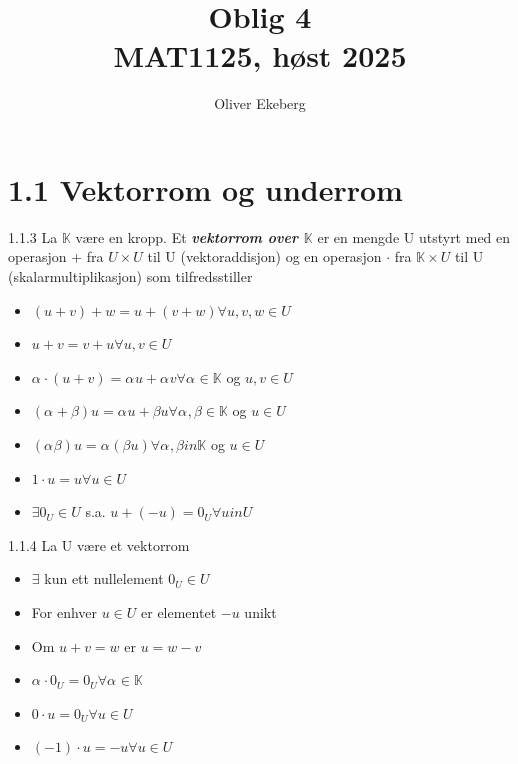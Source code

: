 \documentclass[a4paper,norsk]{article}
\title{Oblig 4 \\ MAT1125, høst 2025}
\author{Oliver Ekeberg}
\begin{document}
\maketitle

\tableofcontents

\section*{1.1 Vektorrom og underrom}

\begin{definitionbox}{1.1.3}{}
La $ \mathbb{K}   $ være en kropp. Et \textbf{\textit{vektorrom over $ \mathbb{K} $ }}er en mengde U utstyrt med en operasjon + fra $ U \times U $ til U (vektoraddisjon) og en operasjon $ \cdot $ fra $ \mathbb{K} \times U $ til U (skalarmultiplikasjon) som tilfredsstiller

\begin{itemize}
    \item $ \left( u+v \right) + w = u + \left( v + w \right) \forall u, v, w \in U$ 
    \item $ u + v = v + u \forall u, v \in U $ 
    \item $ \alpha_{}^{} \cdot \left( u + v \right)  = \alpha_{}^{} u + \alpha_{}^{} v \forall \alpha_{}^{} \in \mathbb{K}$ og $ u, v \in U $
    \item $ \left( \alpha_{}^{} + \beta \right) u = \alpha_{}^{} u + \beta u \forall \alpha_{}^{} , \beta \in \mathbb{K} $ og $ u \in U $    
    \item $ \left( \alpha_{}^{} \beta \right) u = \alpha_{}^{} \left( \beta u \right)  \forall \alpha_{}^{} , \beta in \mathbb{K}  $ og $ u \in U $
    \item $ 1 \cdot u  = u \forall u \in U$
    \item $ \exists 0_U \in U $ s.a. $ u + \left( -u \right) =0_U  \forall u in U$     
\end{itemize}
\end{definitionbox}

\begin{propositionbox}{1.1.4}{}
La U være et vektorrom
\begin{itemize}
    \item $ \exists $ kun ett nullelement $ 0_U \in U $ 
    \item For enhver $ u \in U $ er elementet $ -u  $ unikt
    \item Om $ u + v = w $ er $ u = w - v $    
    \item $ \alpha_{}^{} \cdot 0_U = 0_U  \forall \alpha_{}^{} \in \mathbb{K}$ 
    \item $ 0 \cdot u = 0_U \forall u \in U$ 
    \item $ \left( -1 \right) \cdot u = -u \forall u \in  U $ 
\end{itemize}
\end{propositionbox}
\end{document}
